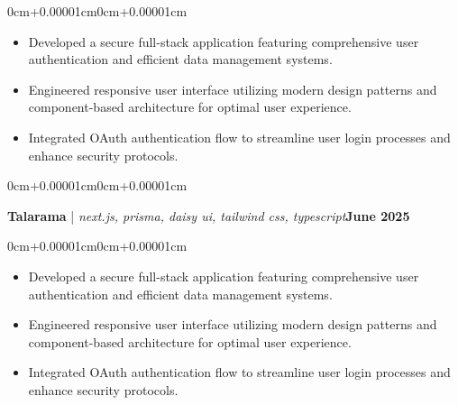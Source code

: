 \documentclass[10pt, letterpaper]{article}
\newenvironment{highlights}{\begin{itemize}[topsep=0.10cm,parsep=0.10cm,partopsep=0pt,itemsep=0pt,leftmargin=0cm+10pt]}{\end{itemize}}
\newenvironment{onecolentry}{\begin{adjustwidth}{0cm+0.00001cm}{0cm+0.00001cm}}{\end{adjustwidth}}
\newenvironment{twocolentry}[2][]{\onecolentry\def\secondColumn{#2}\setcolumnwidth{\fill,5cm}\begin{paracol}{2}}{\switchcolumn \raggedleft \secondColumn\end{paracol}\endonecolentry}
\begin{document}
    \vspace{0.10cm}
    \begin{onecolentry}
        \begin{highlights}
            \item Developed a secure full-stack application featuring comprehensive user authentication and efficient data management systems.
            \item Engineered responsive user interface utilizing modern design patterns and component-based architecture for optimal user experience.
            \item Integrated OAuth authentication flow to streamline user login processes and enhance security protocols.
        \end{highlights}
    \end{onecolentry}
    \vspace{0.15cm}
    \begin{twocolentry}{\textbf{June 2025}}
        \textbf{Talarama} | \textit{next.js, prisma, daisy ui, tailwind css, typescript}\end{twocolentry}
    \vspace{0.10cm}
    \begin{onecolentry}
        \begin{highlights}
            \item Developed a secure full-stack application featuring comprehensive user authentication and efficient data management systems.
            \item Engineered responsive user interface utilizing modern design patterns and component-based architecture for optimal user experience.
            \item Integrated OAuth authentication flow to streamline user login processes and enhance security protocols.
        \end{highlights}
    \end{onecolentry}
    \vspace{0.15cm}
\end{document}

